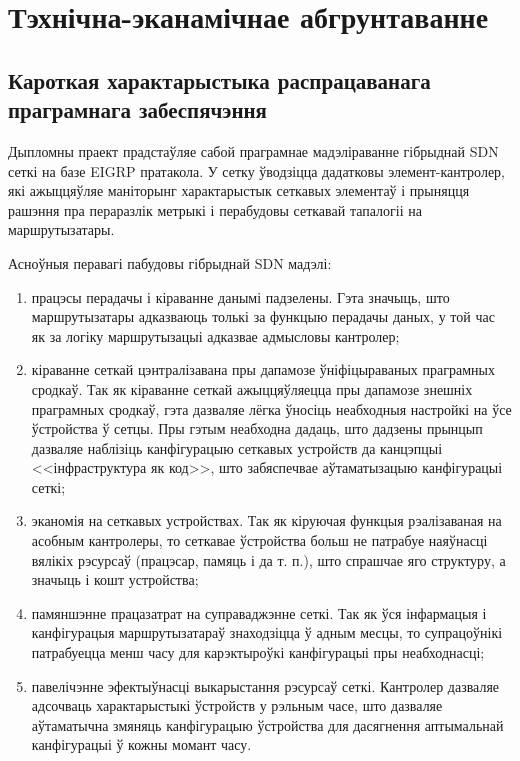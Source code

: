 \section{Тэхнічна-эканамічнае абгрунтаванне}

\subsection{Кароткая характарыстыка распрацаванага праграмнага забеспячэння}

Дыпломны праект прадстаўляе сабой праграмнае мадэліраванне гібрыднай SDN сеткі на базе EIGRP пратакола. У сетку ўводзіцца дадатковы элемент-кантролер, які ажыццяўляе маніторынг характарыстык сеткавых
элементаў і прыняцця рашэння пра пераразлік метрыкі і перабудовы сеткавай тапалогіі на маршрутызатары.

Асноўныя перавагі пабудовы гібрыднай SDN мадэлі:
\begin{enumerate}
    \item працэсы перадачы і кіраванне данымі падзелены. Гэта значыць, што маршрутызатары
        адказваюць толькі за функцыю перадачы даных, у той час як за логіку маршрутызацыі
        адказвае адмысловы кантролер;
    \item кіраванне сеткай цэнтралізавана пры дапамозе ўніфіцыраваных праграмных сродкаў.
        Так як кіраванне сеткай ажыццяўляецца пры дапамозе знешніх праграмных сродкаў, гэта
        дазваляе лёгка ўносіць неабходныя настройкі на ўсе ўстройства ў сетцы.
        Пры гэтым неабходна дадаць, што дадзены прынцып дазваляе наблізіць канфігурацыю
        сеткавых устройств да канцэпцыі <<інфраструктура як код>>, што забяспечвае
        аўтаматызацыю канфігурацыі сеткі;
    \item эканомія на сеткавых устройствах. Так як кіруючая функцыя рэалізаваная на асобным
        кантролеры, то сеткавае ўстройства больш не патрабуе наяўнасці вялікіх рэсурсаў
        (працэсар, памяць і да т. п.), што спрашчае яго структуру, а значыць і кошт устройства;
    \item памяншэнне працазатрат на суправаджэнне сеткі. Так як ўся інфармацыя і канфігурацыя
        маршрутызатараў знаходзіцца ў адным месцы, то супрацоўнікі патрабуецца менш часу для
        карэктыроўкі канфігурацыі пры неабходнасці;
    \item павелічэнне эфектыўнасці выкарыстання рэсурсаў сеткі. Кантролер дазваляе адсочваць
        характарыстыкі ўстройств у рэльным часе, што дазваляе аўтаматычна змяняць канфігурацыю
        ўстройства для дасягнення аптымальнай канфігурацыі ў кожны момант часу.
\end{enumerate}

